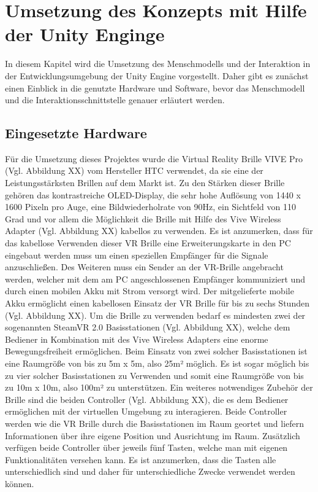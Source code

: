 \chapter{Umsetzung des Konzepts mit Hilfe der Unity Enginge}\label{cha:Umsetzung}
In diesem Kapitel wird die Umsetzung des Menschmodells und der Interaktion in der Entwicklungsumgebung der Unity Engine vorgestellt. Daher gibt es zunächst einen Einblick in die genutzte Hardware und Software, bevor das Menschmodell und die Interaktionsschnittstelle genauer erläutert werden.
\section{Eingesetzte Hardware}\label{sec:Hardware}
Für die Umsetzung dieses Projektes wurde die Virtual Reality Brille VIVE Pro (Vgl. Abbildung XX) vom Hersteller HTC verwendet, da sie eine der Leistungsstärksten Brillen auf dem Markt ist. Zu den Stärken dieser Brille gehören das kontrastreiche OLED-Display, die sehr hohe Auflösung von 1440 x 1600 Pixeln pro Auge, eine Bildwiederholrate von 90Hz, ein Sichtfeld von 110 Grad und vor allem die Möglichkeit die Brille mit Hilfe des Vive Wireless Adapter (Vgl. Abbildung XX) kabellos zu verwenden. Es ist anzumerken, dass für das kabellose Verwenden dieser VR Brille eine Erweiterungskarte in den PC eingebaut werden muss um einen speziellen Empfänger für die Signale anzuschließen. Des Weiteren muss ein Sender an der VR-Brille angebracht werden, welcher mit dem am PC angeschlossenen Empfänger kommuniziert und durch einen mobilen Akku mit Strom versorgt wird. Der mitgelieferte mobile Akku ermöglicht einen kabellosen Einsatz der VR Brille für bis zu sechs Stunden (Vgl. Abbildung XX).
\newline
Um die Brille zu verwenden bedarf es mindesten zwei der sogenannten SteamVR 2.0 Basisstationen (Vgl. Abbildung XX), welche dem Bediener in Kombination mit des Vive Wireless Adapters eine enorme Bewegungsfreiheit ermöglichen. Beim Einsatz von zwei solcher Basisstationen ist eine Raumgröße von bis zu 5m x 5m, also 25m² möglich. Es ist sogar möglich bis zu vier solcher Basisstationen zu Verwenden und somit eine Raumgröße von bis zu 10m x 10m, also 100m² zu unterstützen.
\newline
Ein weiteres notwendiges Zubehör der Brille sind die beiden Controller (Vgl. Abbildung XX), die es dem Bediener ermöglichen mit der virtuellen Umgebung zu interagieren. Beide Controller werden wie die VR Brille durch die Basisstationen im Raum geortet und liefern Informationen über ihre eigene Position und Ausrichtung im Raum. Zusätzlich verfügen beide Controller über jeweils fünf Tasten, welche man mit eigenen Funktionalitäten versehen kann. Es ist anzumerken, dass die Tasten alle unterschiedlich sind und daher für unterschiedliche Zwecke verwendet werden können. 
